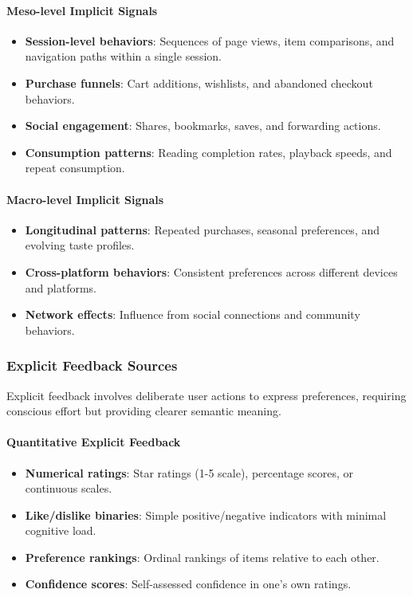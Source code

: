 \documentclass[acmsmall,review,anonymous]{acmart}
\begin{document}
\paragraph{Meso-level Implicit Signals}
\begin{itemize}
    \item \textbf{Session-level behaviors}: Sequences of page views, item comparisons, and navigation paths within a single session.
    \item \textbf{Purchase funnels}: Cart additions, wishlists, and abandoned checkout behaviors.
    \item \textbf{Social engagement}: Shares, bookmarks, saves, and forwarding actions.
    \item \textbf{Consumption patterns}: Reading completion rates, playback speeds, and repeat consumption.
\end{itemize}

\paragraph{Macro-level Implicit Signals}
\begin{itemize}
    \item \textbf{Longitudinal patterns}: Repeated purchases, seasonal preferences, and evolving taste profiles.
    \item \textbf{Cross-platform behaviors}: Consistent preferences across different devices and platforms.
    \item \textbf{Network effects}: Influence from social connections and community behaviors.
\end{itemize}

\subsubsection{Explicit Feedback Sources}
Explicit feedback involves deliberate user actions to express preferences, requiring conscious effort but providing clearer semantic meaning.

\paragraph{Quantitative Explicit Feedback}
\begin{itemize}
    \item \textbf{Numerical ratings}: Star ratings (1-5 scale), percentage scores, or continuous scales.
    \item \textbf{Like/dislike binaries}: Simple positive/negative indicators with minimal cognitive load.
    \item \textbf{Preference rankings}: Ordinal rankings of items relative to each other.
    \item \textbf{Confidence scores}: Self-assessed confidence in one's own ratings.
\end{itemize}
\end{document}
